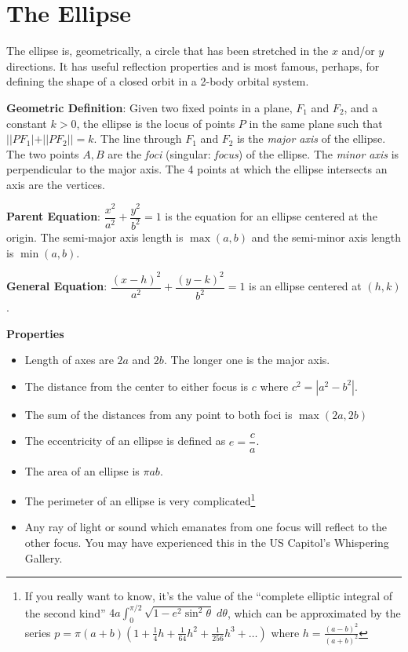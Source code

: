 \documentclass[
]{article}
\author{}
\date{}
\providecommand{\tightlist}{%
  \setlength{\itemsep}{0pt}\setlength{\parskip}{0pt}}
\let\oldsection\section
\renewcommand{\section}[1]{\clearpage\oldsection{#1}}
\def\tightlist{}
\begin{document}
\hypertarget{the-ellipse}{%
\section{The Ellipse}\label{the-ellipse}}

The ellipse is, geometrically, a circle that has been stretched in the
\(x\) and/or \(y\) directions. It has useful reflection properties and
is most famous, perhaps, for defining the shape of a closed orbit in a
2-body orbital system.

\textbf{Geometric Definition}: Given two fixed points in a plane,
\(F_1\) and \(F_2\), and a constant \(k > 0\), the ellipse is the locus
of points \(P\) in the same plane such that \(||PF_1| + ||PF_2|| = k\).
The line through \(F_1\) and \(F_2\) is the \emph{major axis} of the
ellipse. The two points \(A,B\) are the \emph{foci} (singular:
\emph{focus}) of the ellipse. The \emph{minor axis} is perpendicular to
the major axis. The 4 points at which the ellipse intersects an axis are
the vertices.

\textbf{Parent Equation}: \(\dfrac{x^2}{a^2}+\dfrac{y^2}{b^2}=1\) is the
equation for an ellipse centered at the origin. The semi-major axis
length is \(\max(a,b)\) and the semi-minor axis length is \(\min(a,b)\).

\textbf{General Equation}:
\(\dfrac{(x-h)^2}{a^2} + \dfrac{(y-k)^2}{b^2} = 1\) is an ellipse
centered at \((h,k)\).

\textbf{Properties}

\begin{itemize}
\tightlist
\item
  Length of axes are \(2a\) and \(2b\). The longer one is the major
  axis.
\item
  The distance from the center to either focus is \(c\) where
  \(c^2 = |a^2-b^2|\).
\item
  The sum of the distances from any point to both foci is
  \(\max(2a,2b)\)
\item
  The eccentricity of an ellipse is defined as \(e = \dfrac{c}{a}\).
\item
  The area of an ellipse is \(\pi a b\).
\item
  The perimeter of an ellipse is very complicated\footnote{If you really
    want to know, it's the value of the ``complete elliptic integral of
    the second kind''
    \(4a \int_0^{\pi/2} \sqrt{1 - e^2 \sin^2 \theta} \; d\theta\), which
    can be approximated by the series
    \(p = \pi(a+b)\left(1 + \frac14 h + \frac{1}{64}h^2 + \frac{1}{256}h^3 + \ldots\right)\)
    where \(h = \frac{(a-b)^2}{(a+b)^2}\)}
\item
  Any ray of light or sound which emanates from one focus will reflect
  to the other focus. You may have experienced this in the US Capitol's
  Whispering Gallery.
\end{itemize}
\end{document}

